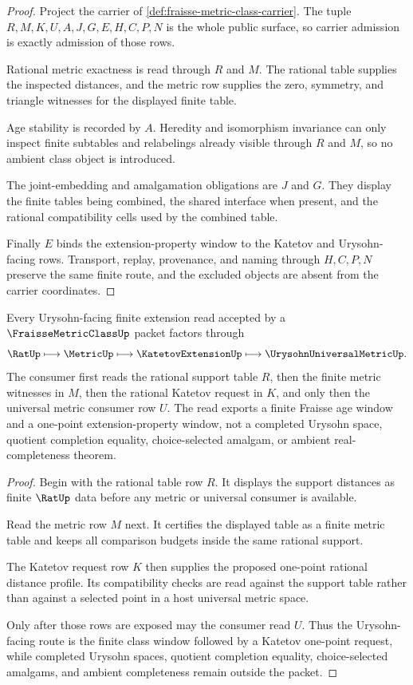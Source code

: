 \begin{proof}
Project the carrier of \autoref{def:fraisse-metric-class-carrier}. The tuple $R,M,K,U,A,J,G,E,H,C,P,N$ is the whole public surface, so carrier admission is exactly admission of those rows.

Rational metric exactness is read through $R$ and $M$. The rational table supplies the inspected distances, and the metric row supplies the zero, symmetry, and triangle witnesses for the displayed finite table.

Age stability is recorded by $A$. Heredity and isomorphism invariance can only inspect finite subtables and relabelings already visible through $R$ and $M$, so no ambient class object is introduced.

The joint-embedding and amalgamation obligations are $J$ and $G$. They display the finite tables being combined, the shared interface when present, and the rational compatibility cells used by the combined table.

Finally $E$ binds the extension-property window to the Katetov and Urysohn-facing rows. Transport, replay, provenance, and naming through $H,C,P,N$ preserve the same finite route, and the excluded objects are absent from the carrier coordinates.
\end{proof}

\begin{theorem}
\label{thm:fraisse-metric-class-extension-property-window}
Every Urysohn-facing finite extension read accepted by a $\FraisseMetricClassUp$ packet factors through
$$
\RatUp \longmapsto \MetricUp \longmapsto \KatetovExtensionUp \longmapsto \UrysohnUniversalMetricUp .
$$
The consumer first reads the rational support table $R$, then the finite metric witnesses in $M$, then the rational Katetov request in $K$, and only then the universal metric consumer row $U$. The read exports a finite Fraisse age window and a one-point extension-property window, not a completed Urysohn space, quotient completion equality, choice-selected amalgam, or ambient real-completeness theorem.
\end{theorem}
\begin{proof}
Begin with the rational table row $R$. It displays the support distances as finite $\RatUp$ data before any metric or universal consumer is available.

Read the metric row $M$ next. It certifies the displayed table as a finite metric table and keeps all comparison budgets inside the same rational support.

The Katetov request row $K$ then supplies the proposed one-point rational distance profile. Its compatibility checks are read against the support table rather than against a selected point in a host universal metric space.

Only after those rows are exposed may the consumer read $U$. Thus the Urysohn-facing route is the finite class window followed by a Katetov one-point request, while completed Urysohn spaces, quotient completion equality, choice-selected amalgams, and ambient completeness remain outside the packet.
\end{proof}

